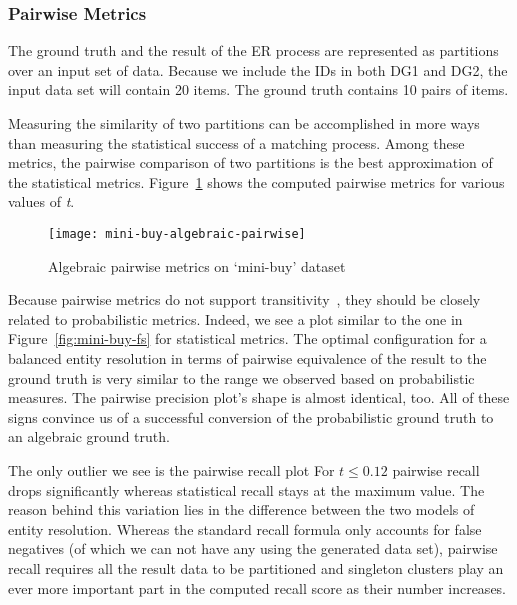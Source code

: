 \subsubsection{Pairwise Metrics}\label{subsubsec:Pairwise Results}

The ground truth and the result of the ER process are represented as partitions
over an input set of data.
Because we include the IDs in both DG1 and DG2, the input data set will
contain 20 items.
The ground truth contains 10 pairs of items.

Measuring the similarity of two partitions can be accomplished in more ways than
measuring the statistical success of a matching process.
Among these metrics, the pairwise comparison of two partitions is the best
approximation of the statistical metrics\cite{Men10}.
Figure~\ref{fig:mini-alg-pairwise} shows the computed pairwise metrics for
various values of \textit{t}.

\begin{figure}[htbp]
    \centering
    \captionsetup{justification=centering}
    \texttt{[image: mini-buy-algebraic-pairwise]}
    \caption{Algebraic pairwise metrics on `mini-buy' dataset}\label{fig:mini-alg-pairwise}
\end{figure}

Because pairwise metrics do not support transitivity~\cite{Men10,hitesh2012},
they should be closely related to probabilistic metrics.
Indeed, we see a plot similar to the one in Figure~\ref{fig:mini-buy-fs} for statistical metrics.
The optimal configuration for a balanced entity resolution in terms of pairwise
equivalence of the result to the ground truth is very similar to the range we
observed based on probabilistic measures.
The pairwise precision plot's shape is almost identical, too.
All of these signs convince us of a successful conversion of the probabilistic
ground truth to an algebraic ground truth.

The only outlier we see is the pairwise recall plot
For $t \le 0.12$ pairwise recall drops significantly whereas statistical recall
stays at the maximum value.
The reason behind this variation lies in the difference between the two models
of entity resolution.
Whereas the standard recall formula only accounts for false negatives (of which
we can not have any using the generated data set), pairwise recall requires all
the result data to be partitioned and singleton clusters play an ever more
important part in the computed recall score as their number increases.

